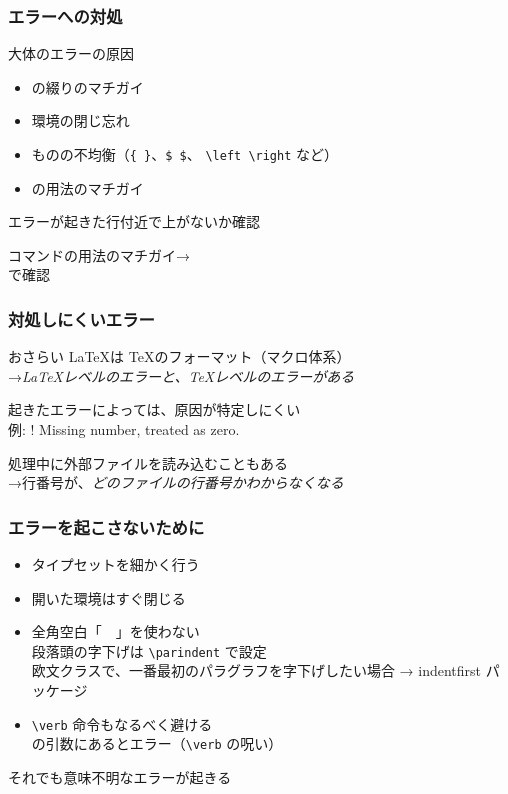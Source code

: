 \begin{frame}
	\frametitle{エラーへの対処}
	\begin{block}{大体のエラーの原因}
		\begin{itemize}
			\item {}の綴りのマチガイ
			\item 環境の閉じ忘れ
			\item ものの不均衡（\texttt{\{ \}}、\texttt{\$ \$}、
				\texttt{\textbackslash left \textbackslash right} など）
			\item {}の用法のマチガイ
		\end{itemize}
	\end{block}

	エラーが起きた行付近で上がないか確認

	コマンドの用法のマチガイ→\\
	 で確認
\end{frame}

\begin{frame}
	\frametitle{対処しにくいエラー}
	\begin{block}{おさらい}
		\LaTeX は \TeX のフォーマット（マクロ体系）\\
		→\emph{\LaTeX レベルのエラーと、\TeX レベルのエラーがある}
	\end{block}
	起きたエラーによっては、原因が特定しにくい\\
	{\footnotesize 例: {\errorfont ! Missing number, treated as zero.}}

	\pause
	処理中に外部ファイルを読み込むこともある\\
	→行番号が、\emph{どのファイルの行番号かわからなくなる}
\end{frame}

\begin{frame}[fragile]
	\frametitle{エラーを起こさないために}
	\begin{itemize}
		\item タイプセットを細かく行う
		\item 開いた環境はすぐ閉じる
		\item 全角空白「　」を使わない\\
			{\footnotesize 段落頭の字下げは \verb+\parindent+ で設定\\
			\tiny 欧文クラスで、一番最初のパラグラフを字下げしたい場合 → indentfirst パッケージ}
		\item \verb+\verb+ 命令もなるべく避ける\\
			{\footnotesize {}の引数にあるとエラー（\verb+\verb+ の呪い）}
	\end{itemize}
	\pause
	それでも意味不明なエラーが起きる
\end{frame}

